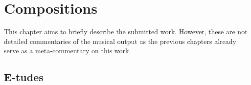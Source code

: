 \hypertarget{chapter7}{}
\chapter{Compositions}

This chapter aims to briefly describe the submitted work. However, these are not detailed commentaries of the musical output as the previous chapters already serve as a meta-commentary on this work. 


\section{E-tudes}

